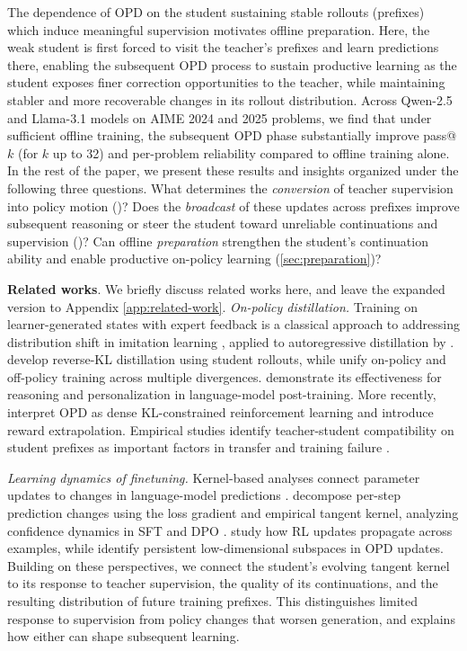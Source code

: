 The dependence of OPD on the student sustaining stable rollouts (prefixes) which induce meaningful supervision motivates offline preparation. Here, the weak student is first forced to visit the teacher's prefixes and learn predictions there, enabling the subsequent OPD process to sustain productive learning as the student exposes finer correction opportunities to the teacher, while maintaining stabler and more recoverable changes in its rollout distribution. Across Qwen-2.5 and Llama-3.1 models on AIME 2024 and 2025 problems, we find that under sufficient offline training, the subsequent OPD phase substantially improve pass@$k$ (for $k$ up to 32) and per-problem reliability compared to offline training alone. In the rest of the paper, we present these results and insights organized under the following three questions. What determines the \emph{conversion} of teacher supervision into policy motion ()? Does the \emph{broadcast} of these updates across prefixes improve subsequent reasoning or steer the student toward unreliable continuations and supervision ()? Can offline \emph{preparation} strengthen the student’s continuation ability and enable productive on-policy learning (\ref{sec:preparation})?


\textbf{Related works}. We briefly discuss related works here, and leave the expanded version to Appendix \cref{app:related-work}. \emph{On-policy distillation.} Training on learner-generated states with expert feedback is a classical approach to addressing distribution shift in imitation learning \citep{ross2011reduction}, applied to autoregressive distillation by \citet{lin2020autoregressiveknowledgedistillationimitation}. \citet{gu2023minillm} develop reverse-KL distillation using student rollouts, while \citet{agarwal2024onpolicydistillation} unify on-policy and off-policy training across multiple divergences. \citet{tinker_opd_2025} demonstrate its effectiveness for reasoning and personalization in language-model post-training. More recently, \citet{yang2026gopd} interpret OPD as dense KL-constrained reinforcement learning and introduce reward extrapolation. Empirical studies identify teacher-student compatibility on student prefixes as important factors in transfer and training failure \citep{rethinking_opd_2026,fu2026revisitingonpolicydistillationempirical}.

\emph{Learning dynamics of finetuning.} Kernel-based analyses connect parameter updates to changes in language-model predictions \citep{malladi2023kernelbasedviewlanguagemodel}. \citet{ren2025learning} decompose per-step prediction changes using the loss gradient and empirical tangent kernel, analyzing confidence dynamics in SFT and DPO \citep{rafailov2024directpreferenceoptimizationlanguage}. \citet{tomihari2026rl} study how RL updates propagate across examples, while \citet{shen2026geometryonpolicydistillation} identify persistent low-dimensional subspaces in OPD updates. Building on these perspectives, we connect the student’s evolving tangent kernel to its response to teacher supervision, the quality of its continuations, and the resulting distribution of future training prefixes. This distinguishes limited response to supervision from policy changes that worsen generation, and explains how either can shape subsequent learning.
